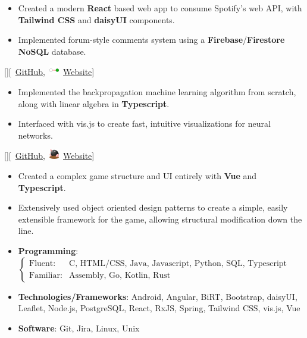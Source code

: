 \documentclass{article}
\begin{document}
\begin{itemize}
	\item Created a modern \textbf{React} based web app to consume Spotify's web
	      API, with \textbf{Tailwind CSS} and \textbf{daisyUI} components.
	\item Implemented forum-style comments system using a
	      \textbf{Firebase}/\textbf{Firestore} \textbf{NoSQL} database.
\end{itemize}

[][\faGithub\
	\href{https://github.com/kinseyda/neural-playground}{GitHub},\
	\includegraphics[height=1.5ex]{neural-icon-small.png}\
	\href{https://kinseyda.github.io/neural-playground/}{Website}]

\begin{itemize}
	\item Implemented the backpropagation machine learning algorithm from
	      scratch, along with linear algebra in \textbf{Typescript}.
	\item Interfaced with vis.js to create fast, intuitive visualizations for
	      neural networks.
\end{itemize}

[][\faGithub\
	\href{https://github.com/kinseyda/moles}{GitHub},\
	\includegraphics[height=1.5ex]{mole-icon-small.png}\
	\href{https://kinseyda.github.io/moles/}{Website}]

\begin{itemize}
	\item Created a complex game structure and UI entirely with \textbf{Vue} and
	      \textbf{Typescript}.
	\item Extensively used object oriented design patterns to create a simple,
	      easily extensible framework for the game, allowing structural
	      modification down the line.
\end{itemize}

\vspace*{\fill}

\fancySection{Skills}

\begin{itemize}

	\item \textbf{Programming}: \(\begin{cases} \text{Fluent:}   & \text{C,
	              HTML/CSS, Java, Javascript, Python, SQL, Typescript}
              \\
              \text{Familiar:} & \text{Assembly, Go, Kotlin, Rust}
	      \end{cases}\)
	\item \textbf{Technologies/Frameworks}: Android, Angular, BiRT, Bootstrap,
	      daisyUI, Leaflet, Node.js, PostgreSQL, React, RxJS, Spring, Tailwind
	      CSS, vis.js, Vue
	\item \textbf{Software}: Git, Jira, Linux, Unix
\end{itemize}
\end{document}
